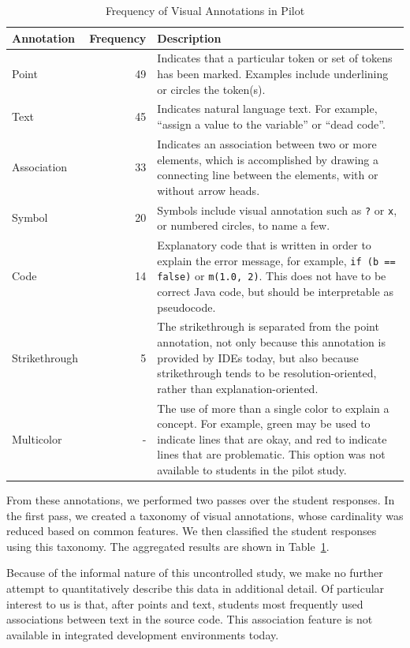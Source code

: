 \documentclass[conference]{IEEEtran}
\begin{document}
\begin{table}[!t]
\caption{Frequency of Visual Annotations in Pilot\label{tab:pilot}}
\centering
\begin{tabularx}{\columnwidth}{lrX}
\toprule
Annotation & Frequency & Description\\
\midrule
Point & 49 & Indicates that a particular token or set of tokens has been marked. Examples include underlining or circles the token(s).\\
Text & 45 & Indicates natural language text. For example, ``assign a value to the variable'' or ``dead code''.\\
Association & 33 & Indicates an association between two or more elements, which is accomplished by drawing a connecting line between the elements, with or without arrow heads.\\
Symbol & 20 & Symbols include visual annotation such as \texttt{?} or \texttt{x}, or numbered circles, to name a few.\\
Code & 14 & Explanatory code that is written in order to explain the error message, for example, \texttt{if (b == false)} or \texttt{m(1.0, 2)}. This does not have to be correct Java code, but should be interpretable as pseudocode.\\
Strikethrough & 5 & The strikethrough is separated from the point annotation, not only because this annotation is provided by IDEs today, but also because strikethrough tends to be resolution-oriented, rather than explanation-oriented.
\\
Multicolor & - & The use of more than a single color to explain a concept. For example, green may be used to indicate lines that are okay, and red to indicate lines that are problematic. This option was not available to students in the pilot study.\\
\bottomrule
\end{tabularx}
\end{table}

From these annotations, we performed two passes over the student responses. In the first pass, we created a taxonomy of visual annotations, whose cardinality was reduced based on common features. We then classified the student responses using this taxonomy. The aggregated results are shown in Table~\ref{tab:pilot}.

Because of the informal nature of this uncontrolled study, we make no further attempt to quantitatively describe this data in additional detail. Of particular interest to us is that, after points and text, students most frequently used associations between text in the source code. This association feature is not available in integrated development environments today.
\end{document}
